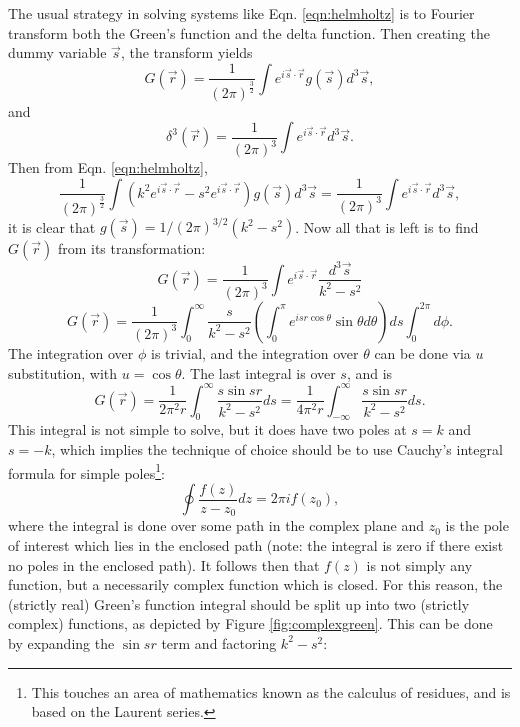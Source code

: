 The usual strategy in solving systems like Eqn. \ref{eqn:helmholtz} is to Fourier transform both the Green's function and the delta function. Then creating the dummy variable $\vec{s}$, the transform yields
%
\begin{equation} \nonumber
G(\vec{r})=\frac{1}{(2\pi)^\frac{3}{2}}\int e^{i\vec{s}\cdot\vec{r}} g(\vec{s})d^3\vec{s},
\end{equation}
and
%
\begin{equation} \nonumber
\delta^3(\vec{r})=\frac{1}{(2\pi)^3}\int e^{i\vec{s}\cdot\vec{r}} d^3\vec{s}.
\end{equation}
Then from Eqn. \ref{eqn:helmholtz},
%
\begin{equation} \nonumber
\frac{1}{(2\pi)^\frac{3}{2}}\int (k^2e^{i\vec{s}\cdot\vec{r}}-s^2e^{i\vec{s}\cdot\vec{r}})g(\vec{s})d^3\vec{s}=\frac{1}{(2\pi)^3}\int e^{i\vec{s}\cdot\vec{r}}d^3\vec{s},
\end{equation}
it is clear that $g(\vec{s})=1/(2\pi)^{3/2}(k^2-s^2)$. Now all that is left is to find $G(\vec{r})$ from its transformation:
%
\begin{equation} \nonumber
G(\vec{r})=\frac{1}{(2\pi)^3}\int e^{i\vec{s}\cdot\vec{r}}\frac{d^3\vec{s}}{k^2-s^2}
\end{equation}
%
\begin{equation} \nonumber
G(\vec{r})=\frac{1}{(2\pi)^3}\int_0^\infty \frac{s}{k^2-s^2} \left(\int_0^\pi e^{isr\cos\theta}\sin\theta d\theta\right)ds \int_0^{2\pi}d\phi.
\end{equation}
The integration over $\phi$ is trivial, and the integration over $\theta$ can be done via $u$ substitution, with $u=\cos\theta$. The last integral is over $s$, and is
%
\begin{equation} \nonumber
G(\vec{r})=\frac{1}{2\pi^2r}\int_0^\infty\frac{s\sin{sr}}{k^2-s^2}ds=\frac{1}{4\pi^2r}\int_{-\infty}^\infty\frac{s\sin{sr}}{k^2-s^2}ds.
\end{equation}
This integral is not simple to solve, but it does have two poles at $s=k$ and $s=-k$, which implies the technique of choice should be to use Cauchy's integral formula for simple poles\footnote{This touches an area of mathematics known as the calculus of residues, and is based on the Laurent series.}:
%
\begin{equation}
\label{eqn:cauchy}
\oint \frac{f(z)}{z-z_0}dz=2\pi if(z_0),
\end{equation}
where the integral is done over some path in the complex plane and $z_0$ is the pole of interest which lies in the enclosed path (note: the integral is zero if there exist no poles in the enclosed path). It follows then that $f(z)$ is not simply any function, but a necessarily complex function which is closed. For this reason, the (strictly real) Green's function integral should be split up into two (strictly complex) functions, as depicted by Figure \ref{fig:complexgreen}. This can be done by expanding the $\sin sr$ term and factoring $k^2-s^2$:
